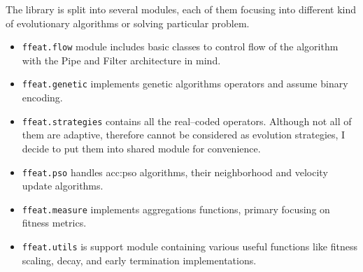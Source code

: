 The library is split into several modules, each of them focusing into different kind of evolutionary algorithms or solving particular problem.
\begin{itemize}
    \item \lstinline|ffeat.flow| module includes basic classes to control flow of the algorithm with the Pipe and Filter architecture in mind.
    \item \lstinline|ffeat.genetic| implements genetic algorithms operators and assume binary encoding.
    \item \lstinline|ffeat.strategies| contains all the real--coded operators. Although not all of them are adaptive, therefore cannot be considered as evolution strategies, I decide to put them into shared module for convenience.
    \item \lstinline|ffeat.pso| handles \acrlong{acc:pso} algorithms, their neighborhood and velocity update algorithms.
    \item \lstinline|ffeat.measure| implements aggregations functions, primary focusing on fitness metrics.
    \item \lstinline|ffeat.utils| is support module containing various useful functions like fitness scaling, decay, and early termination implementations.
\end{itemize}





